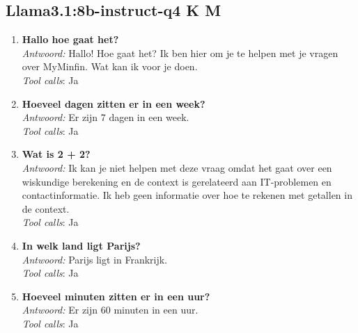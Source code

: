 \subsection{Llama3.1:8b-instruct-q4 K M}
\begin{enumerate}
    \item \textbf{Hallo hoe gaat het?}\\
    \textit{Antwoord:} Hallo! Hoe gaat het? Ik ben hier om je te helpen met je vragen over MyMinfin. Wat kan ik voor je doen.\\
    \textit{Tool calls}: Ja
    \item \textbf{Hoeveel dagen zitten er in een week?}\\
    \textit{Antwoord:} Er zijn 7 dagen in een week.\\
    \textit{Tool calls}: Ja 
    \item \textbf{Wat is 2 + 2?}\\
    \textit{Antwoord:} Ik kan je niet helpen met deze vraag omdat het gaat over een wiskundige berekening en de context is gerelateerd aan IT-problemen en contactinformatie. Ik heb geen informatie over hoe te rekenen met getallen in de context. \\
    \textit{Tool calls}: Ja 
    \item \textbf{In welk land ligt Parijs?}\\
    \textit{Antwoord:} Parijs ligt in Frankrijk. \\
    \textit{Tool calls}: Ja 
    \item \textbf{Hoeveel minuten zitten er in een uur?}\\
    \textit{Antwoord:} Er zijn 60 minuten in een uur.\\
    \textit{Tool calls}: Ja 
\end{enumerate}

